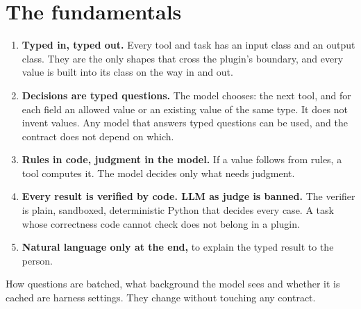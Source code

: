 \section{The fundamentals}

\begin{enumerate}
  \item \textbf{Typed in, typed out.} Every tool and task has an input class
    and an output class. They are the only shapes that cross the plugin's
    boundary, and every value is built into its class on the way in and out.
  \item \textbf{Decisions are typed questions.} The model chooses: the next
    tool, and for each field an allowed value or an existing value of the
    same type. It does not invent values. Any model that answers typed
    questions can be used, and the contract does not depend on which.
  \item \textbf{Rules in code, judgment in the model.} If a value follows
    from rules, a tool computes it. The model decides only what needs
    judgment.
  \item \textbf{Every result is verified by code. LLM as judge is
    banned.} The verifier is plain, sandboxed, deterministic Python that
    decides every case. A task whose correctness code cannot check does not
    belong in a plugin.
  \item \textbf{Natural language only at the end,} to explain the typed
    result to the person.
\end{enumerate}

How questions are batched, what background the model sees and whether it is
cached are harness settings. They change without touching any contract.
